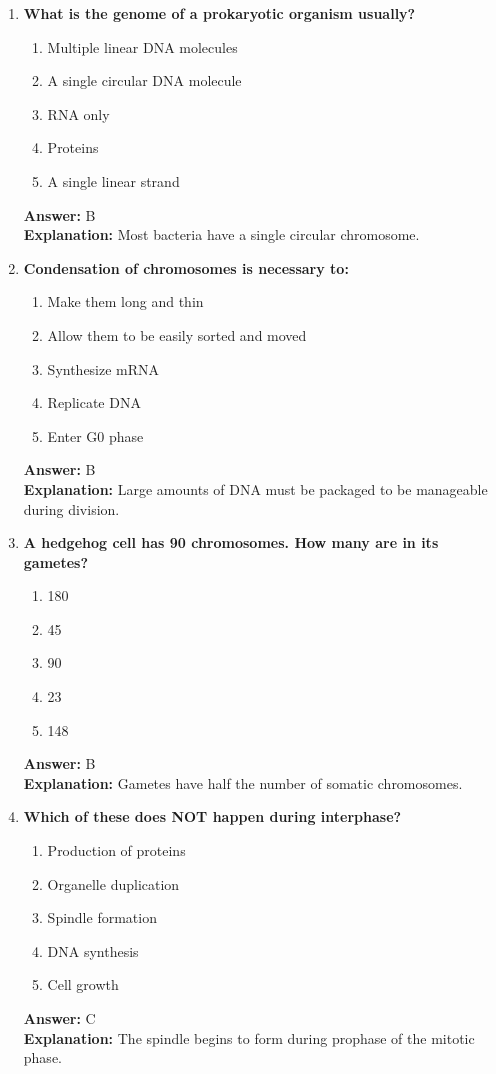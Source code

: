 \documentclass[11pt, a4paper]{article}
\begin{document}
\begin{enumerate}[leftmargin=*, label=\arabic*.]
\item \textbf{What is the genome of a prokaryotic organism usually?}
\begin{enumerate}[label=\Alph*.]
\item Multiple linear DNA molecules
\item A single circular DNA molecule
\item RNA only
\item Proteins
\item A single linear strand
\end{enumerate}
\textbf{Answer:} B \\
\textbf{Explanation:} Most bacteria have a single circular chromosome.

\item \textbf{Condensation of chromosomes is necessary to:}
\begin{enumerate}[label=\Alph*.]
\item Make them long and thin
\item Allow them to be easily sorted and moved
\item Synthesize mRNA
\item Replicate DNA
\item Enter G0 phase
\end{enumerate}
\textbf{Answer:} B \\
\textbf{Explanation:} Large amounts of DNA must be packaged to be manageable during division.

\item \textbf{A hedgehog cell has 90 chromosomes. How many are in its gametes?}
\begin{enumerate}[label=\Alph*.]
\item 180
\item 45
\item 90
\item 23
\item 148
\end{enumerate}
\textbf{Answer:} B \\
\textbf{Explanation:} Gametes have half the number of somatic chromosomes.

\item \textbf{Which of these does NOT happen during interphase?}
\begin{enumerate}[label=\Alph*.]
\item Production of proteins
\item Organelle duplication
\item Spindle formation
\item DNA synthesis
\item Cell growth
\end{enumerate}
\textbf{Answer:} C \\
\textbf{Explanation:} The spindle begins to form during prophase of the mitotic phase.


\end{enumerate}
\end{document}

